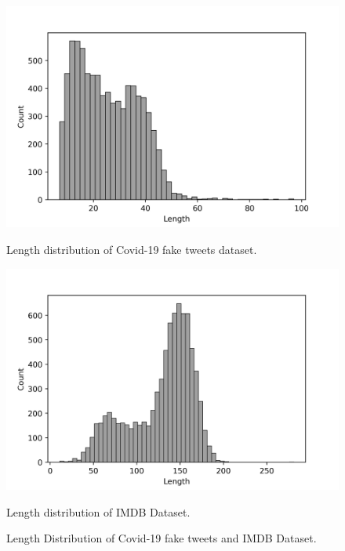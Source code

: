 \documentclass[%
	BCOR=8mm, %
	DIV=12,
	toc=bibliography, %
	toc=listof, %
	oneside, %
	egregdoesnotlikesansseriftitles, %
	]{scrbook}
\begin{document}
\begin{figure}[ht]
    \begin{minipage}[b]{0.5\linewidth}
        \centering
        \includegraphics[width=\textwidth]{img/fakenewsLengthdist.png}
        \caption{Length distribution of Covid-19 fake tweets dataset.}
        \label{fig:fklendist}
    \end{minipage}
    \hspace{0.1cm}
    \begin{minipage}[b]{0.5\linewidth}
        \centering
        \includegraphics[width=\textwidth]{img/ImdbLengthdist.png}
        \caption{Length distribution of IMDB Dataset. }{}
        \label{fig:imdblendist}
    \end{minipage}
    \caption[Length distribution of Covid-19 fake tweets and IMDB Dataset]{\small Length Distribution of Covid-19 fake tweets and IMDB Dataset.}
    \label{fig:lendist}
\end{figure}
\end{document}
